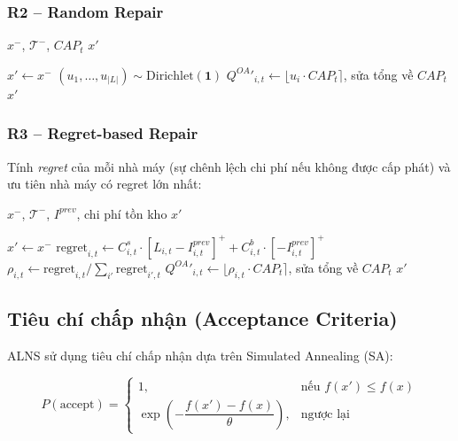 \documentclass[12pt]{article}
\newcommand{\QOA}{Q^{OA}}
\newcommand{\pos}[1]{\left[#1\right]^+}
\begin{document}
\subsubsection*{R2 -- Random Repair}

\begin{algorithm}[H]
\caption{R2: Random Repair (Dirichlet)}
\label{alg:r2}
\begin{algorithmic}[1]
\Require $x^-$, $\mathcal{T}^-$, $CAP_t$
\Ensure $x'$

\State $x' \gets x^-$
  \State $(u_1,\ldots,u_{|L|}) \sim \mathrm{Dirichlet}(\mathbf{1})$
  \State $\QOA'_{i,t} \gets \lfloor u_i \cdot CAP_t \rceil$, sửa tổng về $CAP_t$
\EndFor
\State \Return $x'$

\end{algorithmic}
\end{algorithm}

\subsubsection*{R3 -- Regret-based Repair}

Tính \emph{regret} của mỗi nhà máy (sự chênh lệch chi phí nếu không được cấp phát) và ưu tiên nhà máy có regret lớn nhất:

\begin{algorithm}[H]
\caption{R3: Regret-based Repair}
\label{alg:r3}
\begin{algorithmic}[1]
\Require $x^-$, $\mathcal{T}^-$, $I^{prev}$, chi phí tồn kho
\Ensure $x'$

\State $x' \gets x^-$
    \State $\text{regret}_{i,t} \gets C^s_{i,t} \cdot \pos{L_{i,t} - I^{prev}_{i,t}} + C^b_{i,t} \cdot \pos{-I^{prev}_{i,t}}$
  \EndFor
  \State $\rho_{i,t} \gets \text{regret}_{i,t} / \sum_{i'} \text{regret}_{i',t}$
  \State $\QOA'_{i,t} \gets \lfloor \rho_{i,t} \cdot CAP_t \rceil$, sửa tổng về $CAP_t$
\EndFor
\State \Return $x'$

\end{algorithmic}
\end{algorithm}

\subsection{Tiêu chí chấp nhận (Acceptance Criteria)}

ALNS sử dụng tiêu chí chấp nhận dựa trên Simulated Annealing (SA):

\begin{equation}
  P(\text{accept}) =
  \begin{cases}
    1, & \text{nếu } f(x') \leq f(x) \\
    \exp\!\left(-\dfrac{f(x') - f(x)}{\theta}\right), & \text{ngược lại}
  \end{cases}
  \label{eq:acceptance}
\end{equation}
\end{document}
